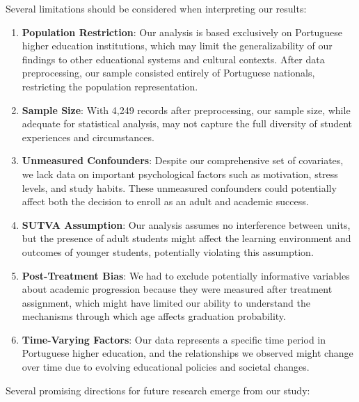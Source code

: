 \documentclass{article}
\begin{document}
Several limitations should be considered when interpreting our results:

\begin{enumerate}
    \item \textbf{Population Restriction}: Our analysis is based exclusively on Portuguese higher education institutions, which may limit the generalizability of our findings to other educational systems and cultural contexts. After data preprocessing, our sample consisted entirely of Portuguese nationals, restricting the population representation.

    \item \textbf{Sample Size}: With 4,249 records after preprocessing, our sample size, while adequate for statistical analysis, may not capture the full diversity of student experiences and circumstances.

    \item \textbf{Unmeasured Confounders}: Despite our comprehensive set of covariates, we lack data on important psychological factors such as motivation, stress levels, and study habits. These unmeasured confounders could potentially affect both the decision to enroll as an adult and academic success.

    \item \textbf{SUTVA Assumption}: Our analysis assumes no interference between units, but the presence of adult students might affect the learning environment and outcomes of younger students, potentially violating this assumption.

    \item \textbf{Post-Treatment Bias}: We had to exclude potentially informative variables about academic progression because they were measured after treatment assignment, which might have limited our ability to understand the mechanisms through which age affects graduation probability.

    \item \textbf{Time-Varying Factors}: Our data represents a specific time period in Portuguese higher education, and the relationships we observed might change over time due to evolving educational policies and societal changes.
\end{enumerate}

Several promising directions for future research emerge from our study:
\end{document}

